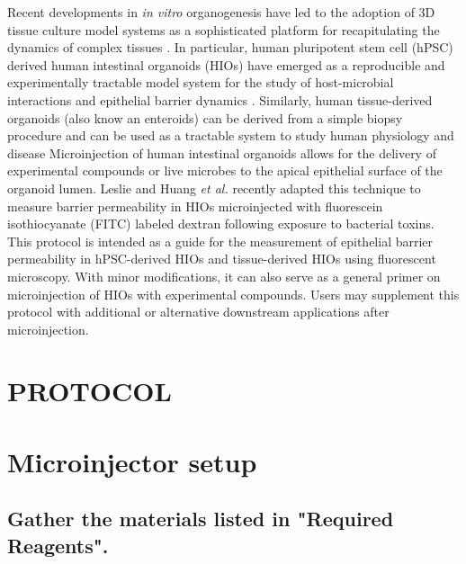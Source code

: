 \documentclass[11pt]{article}
\begin{document}
Recent developments in \emph{in vitro} organogenesis have led to the adoption of 3D tissue culture model systems as a sophisticated platform for recapitulating the dynamics of complex tissues \supercite{Sato:2009,Clevers:2016,Drost:2016,Rookmaaker:2015,Spence:2011,Aurora:2016,Dedhia:2016,Dye:2015,Dye:2016}. In particular, human pluripotent stem cell (hPSC) derived human intestinal organoids (HIOs) \supercite{Spence:2011,McCracken:2011} have emerged as a reproducible and experimentally tractable model system for the study of host-microbial interactions and epithelial barrier dynamics \supercite{Leslie:2015,Leslie:2016,Zachos:2016, Hill:2017}. Similarly, human tissue-derived organoids (also know an enteroids) can be derived from a simple biopsy procedure and can be used as a tractable system to study human physiology and disease \supercite{Sato:2009,Miyoshi:2013,Sato:2011} Microinjection of human intestinal organoids allows for the delivery of experimental compounds \supercite{Leslie:2015} or live microbes \supercite{Engevik:2013, Leslie:2015,Forbester:2015,Engevik:2015} to the apical epithelial surface of the organoid lumen. Leslie and Huang \emph{et al.}\supercite{Leslie:2015} recently adapted this technique to measure barrier permeability in HIOs microinjected with fluorescein isothiocyanate (FITC) labeled dextran following exposure to bacterial toxins.\\

This protocol is intended as a guide for the measurement of epithelial barrier permeability in hPSC-derived HIOs and tissue-derived HIOs using fluorescent microscopy. With minor modifications, it can also serve as a general primer on microinjection of HIOs with experimental compounds. Users may supplement this protocol with additional or alternative downstream applications after microinjection.\\

\section*{PROTOCOL}
\section{{\sffamily } Microinjector setup}
\label{sec:orgheadline10}
\subsection{{\sffamily } Gather the materials listed in "Required Reagents".}
\label{sec:orgheadline1}
\end{document}
